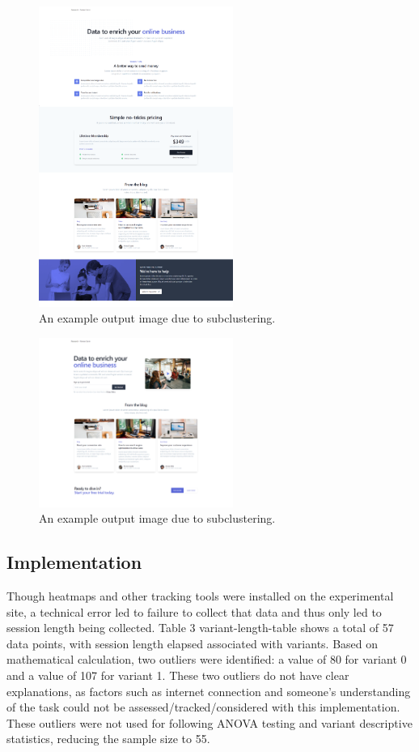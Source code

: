 \documentclass[conference]{IEEEtran}
\begin{document}
\begin{figure}[h]
\centering
\label{fig:variant1}
\includegraphics[width=2.5in]{media/hwVB0eKUehxy.png}
\caption{An example output image due to subclustering.}
\end{figure}

\begin{figure}[h]
\centering
\label{fig:variant2}
\includegraphics[width=2.5in]{media/vtc5qYP2r8Ut.png}
\caption{An example output image due to subclustering.}
\end{figure}

\subsection{Implementation}

Though heatmaps and other tracking tools were installed on the experimental site, a technical error led to failure to collect that data and thus only led to session length being collected. Table 3 {variant-length-table} shows a total of 57 data points, with session length elapsed associated with variants. Based on mathematical calculation, two outliers were identified: a value of 80 for variant 0 and a value of 107 for variant 1. These two outliers do not have clear explanations, as factors such as internet connection and someone's understanding of the task could not be assessed/tracked/considered with this implementation. These outliers were not used for following ANOVA testing and variant descriptive statistics, reducing the sample size to 55.
\end{document}
